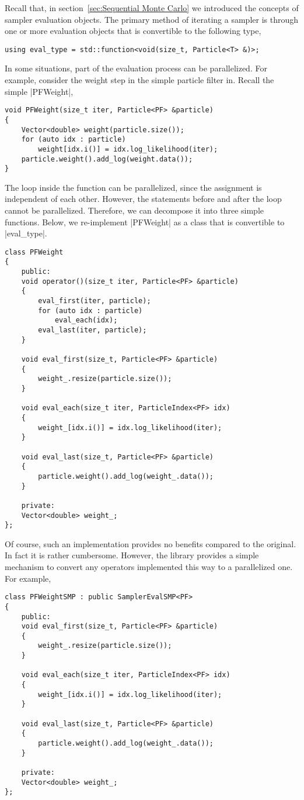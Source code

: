 Recall that, in section~\ref{sec:Sequential Monte Carlo} we introduced the
concepts of sampler evaluation objects. The primary method of iterating a
sampler is through one or more evaluation objects that is convertible to the
following type,
\begin{verbatim}
using eval_type = std::function<void(size_t, Particle<T> &)>;
\end{verbatim}
In some situations, part of the evaluation process can be parallelized. For
example, consider the weight step in the simple particle filter in. Recall the
simple |PFWeight|,
\begin{verbatim}
void PFWeight(size_t iter, Particle<PF> &particle)
{
    Vector<double> weight(particle.size());
    for (auto idx : particle)
        weight[idx.i()] = idx.log_likelihood(iter);
    particle.weight().add_log(weight.data());
}
\end{verbatim}
The loop inside the function can be parallelized, since the assignment is
independent of each other. However, the statements before and after the loop
cannot be parallelized. Therefore, we can decompose it into three simple
functions. Below, we re-implement |PFWeight| as a class that is convertible to
|eval_type|.
\begin{verbatim}
class PFWeight
{
    public:
    void operator()(size_t iter, Particle<PF> &particle)
    {
        eval_first(iter, particle);
        for (auto idx : particle)
            eval_each(idx);
        eval_last(iter, particle);
    }

    void eval_first(size_t, Particle<PF> &particle)
    {
        weight_.resize(particle.size());
    }

    void eval_each(size_t iter, ParticleIndex<PF> idx)
    {
        weight_[idx.i()] = idx.log_likelihood(iter);
    }

    void eval_last(size_t, Particle<PF> &particle)
    {
        particle.weight().add_log(weight_.data());
    }

    private:
    Vector<double> weight_;
};
\end{verbatim}
Of course, such an implementation provides no benefits compared to the
original. In fact it is rather cumbersome. However, the library provides a
simple mechanism to convert any operators implemented this way to a
parallelized one. For example,
\begin{verbatim}
class PFWeightSMP : public SamplerEvalSMP<PF>
{
    public:
    void eval_first(size_t, Particle<PF> &particle)
    {
        weight_.resize(particle.size());
    }

    void eval_each(size_t iter, ParticleIndex<PF> idx)
    {
        weight_[idx.i()] = idx.log_likelihood(iter);
    }

    void eval_last(size_t, Particle<PF> &particle)
    {
        particle.weight().add_log(weight_.data());
    }

    private:
    Vector<double> weight_;
};
\end{verbatim}
